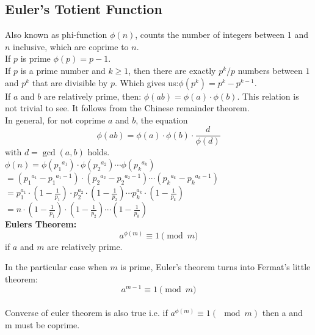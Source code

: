 \documentclass[8pt, a4paper, oneside, twocolumn]{extarticle}
\begin{document}
\subsection{Euler's Totient Function}
Also known as phi-function $\phi (n)$, counts the number of integers between 1 and $n$ inclusive, which are coprime to $n$.
\\If $p$ is prime $\phi (p) = p - 1.$
\\If $p$ is a prime number and $k \ge 1$, then there are exactly $p^k / p$ numbers between $1$ and $p^k$ that are divisible by $p$. Which gives us:$\phi(p^k) = p^k - p^{k-1}.$
\\If $a$ and $b$ are relatively prime, then: $\phi(a b) = \phi(a) \cdot \phi(b).$ This relation is not trivial to see. It follows from the Chinese remainder theorem.
\\In general, for not coprime $a$ and $b$, the equation $$\phi(ab) = \phi(a) \cdot \phi(b) \cdot \dfrac{d}{\phi(d)}$$ with $d = \gcd(a, b)$ holds.\\
$ \phi (n) = \phi ({p_1}^{a_1}) \cdot \phi ({p_2}^{a_2}) \cdots \phi ({p_k}^{a_k})$\\
$ = \left({p_1}^{a_1} - {p_1}^{a_1 - 1}\right) \cdot \left({p_2}^{a_2} - {p_2}^{a_2 - 1}\right) \cdots \left({p_k}^{a_k} - {p_k}^{a_k - 1}\right)$\\
$ = p_1^{a_1} \cdot \left(1 - \frac{1}{p_1}\right) \cdot p_2^{a_2} \cdot \left(1 - \frac{1}{p_2}\right) \cdots p_k^{a_k} \cdot \left(1 - \frac{1}{p_k}\right)$ \\ 
$= n \cdot \left(1 - \frac{1}{p_1}\right) \cdot \left(1 - \frac{1}{p_2}\right) \cdots \left(1 - \frac{1}{p_k}\right) $\\
\textbf{Eulers Theorem: }\\
$$a^{\phi(m)} \equiv 1 \pmod m$$ if $a$ and $m$ are relatively prime.

In the particular case when $m$ is prime, Euler's theorem turns into Fermat's little theorem: $$a^{m - 1} \equiv 1 \pmod m$$
\\Converse of euler theorem is also true i.e. if $a^{\phi(m)} \equiv 1 (\mod m)$ then a and m must be coprime.
\end{document}
